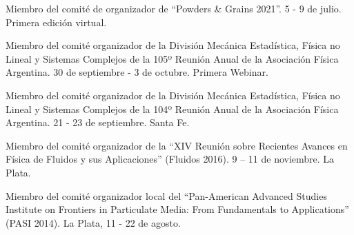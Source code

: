  Miembro del comité de organizador de ``Powders \& Grains 2021''. 5 - 9 de julio. Primera edición virtual.

 Miembro del comité organizador de la División Mecánica Estadística, Física no Lineal y Sistemas Complejos de la 105º Reunión Anual de la Asociación Física Argentina. 30 de septiembre - 3 de octubre. Primera Webinar.

 Miembro del comité organizador de la División Mecánica Estadística, Física no Lineal y Sistemas Complejos de la 104º Reunión Anual de la Asociación Física Argentina. 21 - 23 de septiembre.
Santa Fe.

 Miembro del comité organizador de la ``XIV Reunión sobre Recientes Avances en Física de Fluidos y sus Aplicaciones'' (Fluidos 2016). 9 -- 11 de noviembre. La Plata.

 Miembro del comité organizador local del ``Pan-American Advanced Studies Institute on Frontiers in Particulate Media: From Fundamentals to Applications'' (PASI 2014). La Plata, 11 - 22 de agosto.
